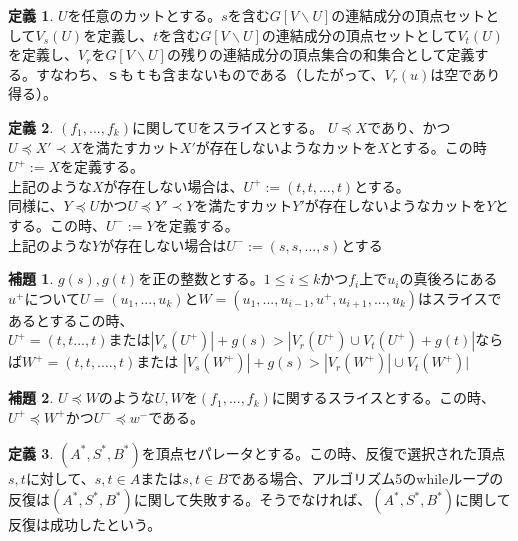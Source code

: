 \documentclass{jarticle}
\theoremstyle{definition}
\newtheorem{lemma}{補題}
\newtheorem{definition}{定義}
\begin{document}
\begin{definition}
    $U$を任意のカットとする。$s$を含む$G [V\backslash U]$の連結成分の頂点セットとして$V_s(U)$を定義し、$t$を含む$G [V\backslash U]$の連結成分の頂点セットとして$V_t(U)$を定義し、$V_r$を$G [V \backslash U]$の残りの連結成分の頂点集合の和集合として定義する。すなわち、$ｓ$も$ｔ$も含まないものである（したがって、$V_r(u)$は空であり得る）。
\end{definition}

\begin{definition}
    $(f_1,...,f_k)$に関してUをスライスとする。
    $U\preceq X$であり、かつ$U\preceq X'\prec X$を満たすカット$X'$が存在しないようなカットを$X$とする。この時$U^+:=X$を定義する。\\
    上記のような$X$が存在しない場合は、$U^+:=(t,t,...,t)$とする。\\
    同様に、$Y\preceq U$かつ$U\preceq Y'\prec Y$を満たすカット$Y'$が存在しないようなカットを$Y$とする。この時、$U^-:=Y$を定義する。\\
    上記のような$Y$が存在しない場合は$U^-:=(s,s,...,s)$とする 
\end{definition}

\begin{lemma}
    $g(s),g(t)$を正の整数とする。$1\leq i\leq k$かつ$f_i$上で$u_i$の真後ろにある$u^+$について$U=(u_1,...,u_k)$と$W=(u_1,...,u_{i-1},u^+,u_{i+1},...,u_k)$はスライスであるとするこの時、\\
    $U^+=(t,t...,t)$または$|V_s(U^+)|+g(s)>|V_r(U^+)\cup V_t(U^+)+g(t)|$ならば$W^+=(t,t,....,t)$または
    $|V_s(W^+)|+g(s)>|V_r(W^+)|\cup V_t(W^+)|$
\end{lemma}

\begin{lemma}
    $U \preceq W$のような$U,W$を$(f_1,...,f_k)$に関するスライスとする。この時、$U^+ \preceq W^+$かつ$U^- \preceq w^-$である。
\end{lemma}

\begin{definition}
    $(A^*,S^*,B^*)$を頂点セパレータとする。この時、反復で選択された頂点$s,t$に対して、$s,t\in A$または$s,t\in B$である場合、アルゴリズム5のwhileループの反復は$(A^*,S^*,B^*)$に関して失敗する。そうでなければ、$(A^*,S^*,B^*)$に関して反復は成功したという。
\end{definition}
   
\end{document}
